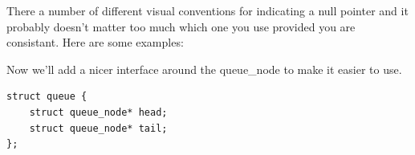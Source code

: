 
There a number of different visual conventions for indicating a null pointer and it probably doesn't 
matter too much which one you use provided you are consistant. 
Here are some examples:

\begin{center}
\end{center}



Now we'll add a nicer interface around the queue\_node to make it easier to use.

\begin{lstlisting}
struct queue {
    struct queue_node* head;
    struct queue_node* tail;
};
\end{lstlisting}

